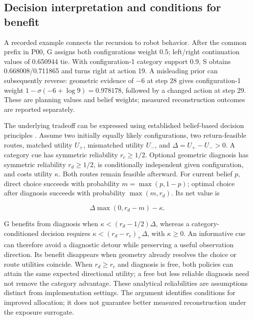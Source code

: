 \documentclass[11pt,a4paper]{article}
\providecommand{\hypertarget}[2]{#2}
\begin{document}
\hypertarget{decision-interpretation-and-conditions-for-benefit}{%
\subsection{Decision interpretation and conditions for benefit}\label{decision-interpretation-and-conditions-for-benefit}}

A recorded example connects the recursion to robot behavior. After the common prefix in P00, G assigns both configurations weight 0.5; left/right continuation values of 0.650944 tie. With configuration-1 category support 0.9, S obtains 0.668008/0.711865 and turns right at action 19. A misleading prior can subsequently reverse: geometric evidence of \(-6\) at step 28 gives configuration-1 weight \(1-\sigma(-6+\log9)=0.978178\), followed by a changed action at step 29. These are planning values and belief weights; measured reconstruction outcomes are reported separately.

The underlying tradeoff can be expressed using established belief-based decision principles \cite{ref12,ref13}. Assume two initially equally likely configurations, two return-feasible routes, matched utility \(U_+\), mismatched utility \(U_-\), and \(\Delta=U_+-U_->0\). A category cue has symmetric reliability \(r_c\ge1/2\). Optional geometric diagnosis has symmetric reliability \(r_d\ge1/2\), is conditionally independent given configuration, and costs utility \(\kappa\). Both routes remain feasible afterward. For current belief \(p\), direct choice succeeds with probability \(m=\max(p,1-p)\); optimal choice after diagnosis succeeds with probability \(\max(m,r_d)\). Its net value is

\[
\Delta\max(0,r_d-m)-\kappa.
\]

G benefits from diagnosis when \(\kappa<(r_d-1/2)\Delta\), whereas a category-conditioned decision requires \(\kappa<(r_d-r_c)_+\Delta\), with \(\kappa\ge0\). An informative cue can therefore avoid a diagnostic detour while preserving a useful observation direction. Its benefit disappears when geometry already resolves the choice or route utilities coincide. When \(r_d\ge r_c\) and diagnosis is free, both policies can attain the same expected directional utility; a free but less reliable diagnosis need not remove the category advantage. These analytical reliabilities are assumptions distinct from implementation settings. The argument identifies conditions for improved allocation; it does not guarantee better measured reconstruction under the exposure surrogate.
\end{document}
